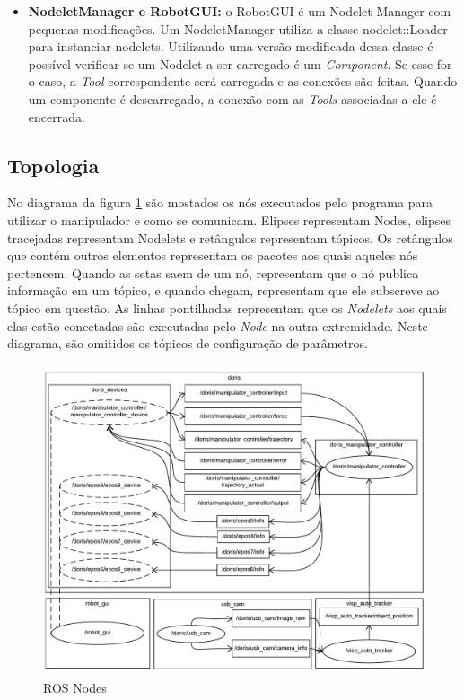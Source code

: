 \begin{itemize}
\item \textbf{NodeletManager e RobotGUI:} o RobotGUI é um Nodelet Manager com pequenas modificações. Um NodeletManager utiliza a classe nodelet::Loader para instanciar nodelets. Utilizando uma versão modificada dessa classe é possível verificar se um Nodelet a ser carregado é um \textit{Component}. Se esse for o caso, a \textit{Tool} correspondente será carregada e as conexões são feitas. Quando um componente é descarregado, a conexão com as \textit{Tools} associadas a ele é encerrada.
\end{itemize}



\subsection{Topologia}

No diagrama da figura \ref{fig:ros_nodes} são mostados os nós executados pelo programa para utilizar o manipulador e como se comunicam. Elipses representam Nodes, elipses tracejadas representam Nodelets e retângulos representam tópicos. Os retângulos que contém outros elementos representam os pacotes aos quais aqueles nós pertencem. Quando as setas saem de um nó, representam que o nó publica informação em um tópico, e quando chegam, representam que ele subscreve ao tópico em questão. As linhas pontilhadas representam que os \textit{Nodelets} aos quais elas estão conectadas são executadas pelo \textit{Node} na outra extremidade. Neste diagrama, são omitidos os tópicos de configuração de parâmetros.

\begin{figure}[!h]
  \centering
  \includegraphics[width=\linewidth]{./img/node_diagram}
  \caption{ROS Nodes}
  \label{fig:ros_nodes}
\end{figure}


